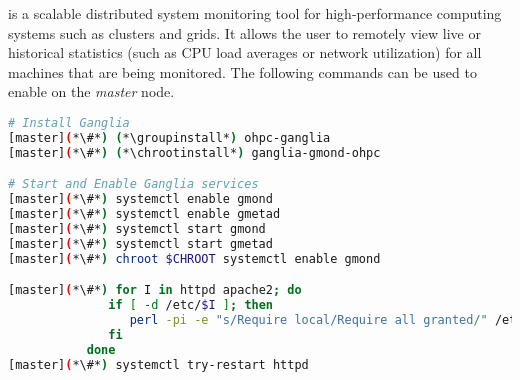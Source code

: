 \Ganglia{} is a scalable distributed system monitoring tool for high-performance
computing systems such as clusters and grids. It allows the user to remotely
view live or historical statistics (such as CPU load averages or network
utilization) for all machines that are being monitored.  The following commands
can be used to enable  \Ganglia{} on the {\em master} node.

\begin{lstlisting}[language=bash,keywords={},upquote=true]
# Install Ganglia
[master](*\#*) (*\groupinstall*) ohpc-ganglia
[master](*\#*) (*\chrootinstall*) ganglia-gmond-ohpc

# Start and Enable Ganglia services
[master](*\#*) systemctl enable gmond
[master](*\#*) systemctl enable gmetad
[master](*\#*) systemctl start gmond
[master](*\#*) systemctl start gmetad
[master](*\#*) chroot $CHROOT systemctl enable gmond

[master](*\#*) for I in httpd apache2; do
              if [ -d /etc/$I ]; then
                 perl -pi -e "s/Require local/Require all granted/" /etc/$I/conf.d/ganglia-ohpc.conf
              fi
           done 
[master](*\#*) systemctl try-restart httpd
\end{lstlisting}

